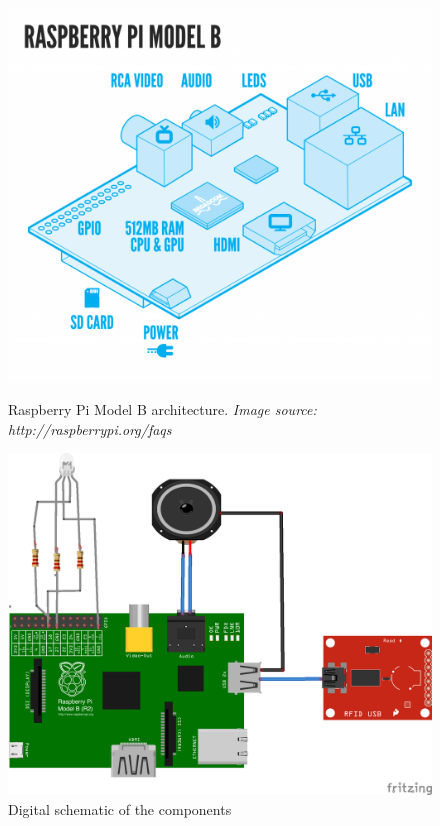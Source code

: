 \begin{figure}[H] 
	\begin{minipage}[b]{0.4\linewidth}
	\centering
		\includegraphics[width=0.3\paperwidth]{Pictures/rpi-arch-overview.png}
	\caption[Raspberry Pi Model B Architecture]{Raspberry Pi Model B architecture. \emph{Image source: http://raspberrypi.org/faqs} }
	\label{fig:pi-arch-overview}
	\end{minipage}
	\hspace{2.0cm}
	\begin{minipage}[b]{0.4\linewidth}
		\centering
			\includegraphics[width=0.3\paperwidth]{Pictures/pi-fritzing-model.png}
		\caption{Digital schematic of the components}
		\label{fig:pi-fritzing}
	\end{minipage}
\end{figure}
 
